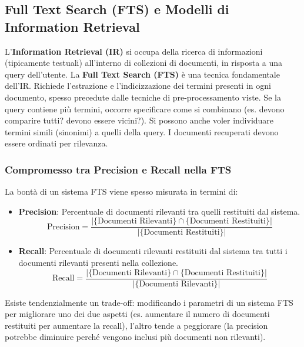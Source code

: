 \documentclass{article}
\begin{document}
\subsection{Full Text Search (FTS) e Modelli di Information Retrieval}
L'\textbf{Information Retrieval (IR)} si occupa della ricerca di informazioni (tipicamente testuali) all'interno di collezioni di documenti, in risposta a una query dell'utente. La \textbf{Full Text Search (FTS)} è una tecnica fondamentale dell'IR. Richiede l'estrazione e l'indicizzazione dei termini presenti in ogni documento, spesso precedute dalle tecniche di pre-processamento viste.
Se la query contiene più termini, occorre specificare come si combinano (es. devono comparire tutti? devono essere vicini?). Si possono anche voler individuare termini simili (sinonimi) a quelli della query. I documenti recuperati devono essere ordinati per rilevanza.

\subsubsection{Compromesso tra Precision e Recall nella FTS}
La bontà di un sistema FTS viene spesso misurata in termini di:
\begin{itemize}
    \item \textbf{Precision}: Percentuale di documenti rilevanti tra quelli restituiti dal sistema.
          $$ \text{Precision} = \frac{|\{\text{Documenti Rilevanti}\} \cap \{\text{Documenti Restituiti}\}|}{|\{\text{Documenti Restituiti}\}|} $$
    \item \textbf{Recall}: Percentuale di documenti rilevanti restituiti dal sistema tra tutti i documenti rilevanti presenti nella collezione.
          $$ \text{Recall} = \frac{|\{\text{Documenti Rilevanti}\} \cap \{\text{Documenti Restituiti}\}|}{|\{\text{Documenti Rilevanti}\}|} $$
\end{itemize}
Esiste tendenzialmente un trade-off: modificando i parametri di un sistema FTS per migliorare uno dei due aspetti (es. aumentare il numero di documenti restituiti per aumentare la recall), l'altro tende a peggiorare (la precision potrebbe diminuire perché vengono inclusi più documenti non rilevanti).
\end{document}

